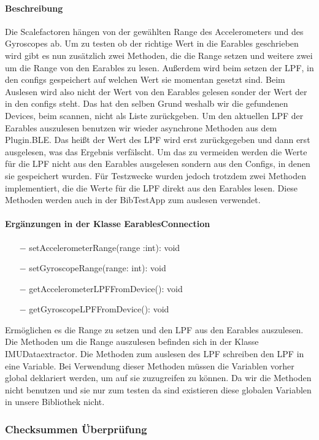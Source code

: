 \documentclass[a4paper,12pt]{article}
\begin{document}
\paragraph{Beschreibung}
Die Scalefactoren hängen von der gewählten Range des Accelerometers und des Gyroscopes ab. Um zu testen ob der richtige Wert in die  Earables geschrieben wird gibt es nun zusätzlich zwei Methoden, die die Range setzen und weitere zwei um die Range von den Earables zu lesen.
Außerdem wird beim setzen der LPF, in den configs gespeichert auf welchen Wert sie momentan gesetzt sind. Beim Auslesen wird also nicht der Wert von den Earables gelesen sonder der Wert der in den configs steht. Das hat den selben Grund weshalb wir die gefundenen Devices, beim scannen, nicht als Liste zurückgeben. Um den aktuellen LPF der Earables auszulesen benutzen wir wieder asynchrone Methoden aus dem Plugin.BLE. Das heißt der Wert des LPF wird erst zurückgegeben und dann erst ausgelesen, was das Ergebnis verfälscht. Um das zu vermeiden werden die Werte für die LPF nicht aus den Earables ausgelesen sondern aus den Configs, in denen sie gespeichert wurden. Für Testzwecke wurden jedoch trotzdem zwei Methoden implementiert, die die Werte für die LPF direkt aus den Earables lesen. Diese Methoden werden auch in der BibTestApp zum auslesen verwendet.

\paragraph{Ergänzungen in der Klasse EarablesConnection}
\begin{itemize}
	\item[$-$] setAccelerometerRange(range :int): void
	\item[$-$] setGyroscopeRange(range: int): void
	\item[$-$ ] getAccelerometerLPFFromDevice(): void
	\item[$-$ ] getGyroscopeLPFFromDevice(): void
\end{itemize}
Ermöglichen es die Range zu setzen und den LPF aus den Earables auszulesen. Die Methoden um die Range auszulesen befinden sich in der Klasse IMUDataextractor. Die Methoden zum auslesen des  LPF schreiben den LPF in eine Variable. Bei Verwendung dieser Methoden müssen die Variablen vorher global deklariert werden, um auf sie zuzugreifen zu können. Da wir die Methoden nicht benutzen und sie nur zum testen da sind existieren diese globalen Variablen in unsere Bibliothek nicht.

\subsubsection{Checksummen Überprüfung}
\end{document}
